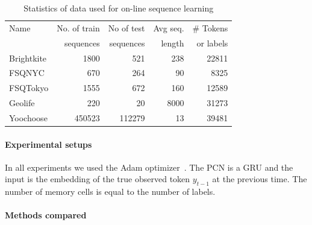 \documentclass[letterpaper]{article} %
\begin{document}
\begin{table}
\begin{center}
\begin{tabular}{|l|r|r|r|r|} \hline
Name & No. of train & No of test & Avg seq. & \# Tokens \\
         &  sequences & sequences & length &  or labels  \\ \hline
Brightkite & 1800  & 521  & 238  &  22811 \\
FSQNYC & 670  &  264  & 90  &  8325 \\
FSQTokyo & 1555  & 672  & 160  &  12589 \\
Geolife & 220  & 20  & 8000 &   31273\\
Yoochoose &  450523 & 112279  & 13 &   39481\\ \hline
\end{tabular}
\end{center}
\caption{\label{sequence-data} Statistics of data used for on-line sequence learning}
\end{table}
\paragraph*{Experimental setups}
In all experiments we used the Adam optimizer~\cite{KingmaB14}.  The PCN is a GRU and the input is the embedding of the true observed token $y_{t-1}$ at the previous time.  
The number of memory cells is equal to the number of labels.



\paragraph*{Methods compared}
\end{document}

